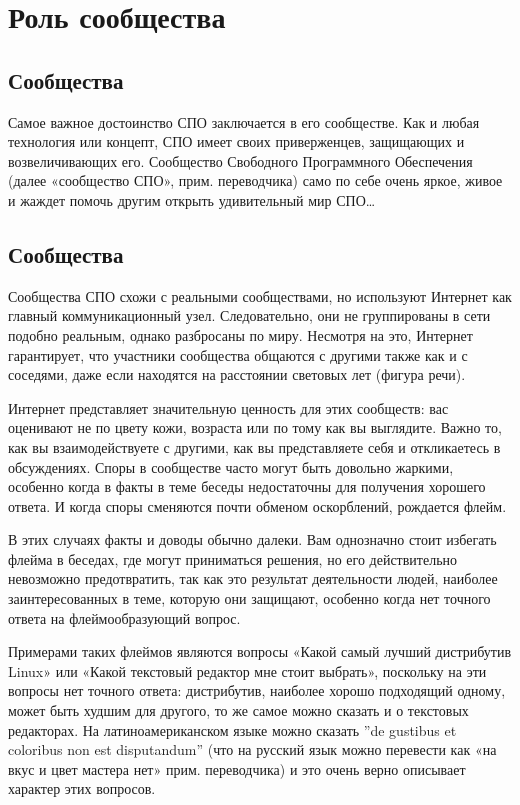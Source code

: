 \documentclass[12pt]{book}
\begin{document}
\newpage


\chapter{Роль сообщества}

\section*{Сообщества}

Самое важное достоинство СПО заключается в его сообществе. Как и любая технология или концепт, СПО имеет своих приверженцев, защищающих и возвеличивающих его. Сообщество Свободного Программного Обеспечения (далее «сообщество СПО», прим. переводчика) само по себе очень яркое, живое и жаждет помочь другим открыть удивительный мир СПО\ldots

\section{Сообщества}

Сообщества СПО схожи с реальными сообществами, но используют Интернет как главный коммуникационный узел. Следовательно, они не группированы в сети подобно реальным, однако разбросаны по миру. Несмотря на это, Интернет гарантирует, что участники сообщества общаются с другими также как и с соседями, даже если находятся на расстоянии световых лет (фигура речи).

Интернет представляет значительную ценность для этих сообществ: вас оценивают не по цвету кожи, возраста или по тому как вы выглядите. Важно то, как вы взаимодействуете с другими, как вы представляете себя и откликаетесь в обсуждениях. Споры в сообществе часто могут быть довольно жаркими, особенно когда в факты в теме беседы недостаточны для получения хорошего ответа. И когда споры сменяются почти обменом оскорблений, рождается флейм.

В этих случаях факты и доводы обычно далеки. Вам однозначно стоит избегать флейма в беседах, где могут приниматься решения, но его действительно невозможно предотвратить, так как это результат деятельности людей, наиболее заинтересованных в теме, которую они защищают, особенно когда нет точного ответа на флеймообразующий вопрос. 

Примерами таких флеймов являются вопросы «Какой самый лучший дистрибутив Linux» или «Какой текстовый редактор мне стоит выбрать», поскольку на эти вопросы нет точного ответа: дистрибутив, наиболее хорошо подходящий одному, может быть худшим для другого, то же самое можно сказать и о текстовых редакторах. На латиноамериканском языке можно сказать ''de gustibus et coloribus non est disputandum'' (что на русский язык можно перевести как «на вкус и цвет мастера нет» прим. переводчика) и это очень верно описывает характер этих вопросов. 
\end{document}
